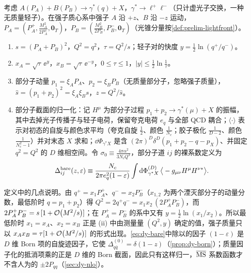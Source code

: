 \begin{definition}[DY 运动学]\label{def:dy-kin}
考虑 $A(P_A)+B(P_B)\to\gamma^*(q)+X$，$\gamma^*\to\ell^+\ell^-$（只计虚光子交换，一种无质量轻子）。在强子质心系中强子 $A$ 沿 $+z$、$B$ 沿 $-z$ 运动，
$P_A=(P_A^+,\frac{M_A^2}{2P_A^+},\mathbf 0_T)$，$P_B=(\frac{M_B^2}{2P_B^-},P_B^-,\mathbf 0_T)$（光锥分量按\cref{def:prelim-lightfront}）。
\begin{enumerate}[label=(\roman*),leftmargin=2.2em,itemsep=1pt,topsep=2pt]
\item $s=(P_A+P_B)^2$，$Q^2=q^2$，$\tau=Q^2/s$；轻子对的快度 $y=\frac12\ln(q^+/q^-)$。
\item $x_A=\sqrt\tau\,\ee^{y}$，$x_B=\sqrt\tau\,\ee^{-y}$，$0\le\tau\le1$，$|y|\le\frac12\ln\frac1\tau$。
\item 部分子动量 $p_1=\xi_AP_A$、$p_2=\xi_BP_B$（无质量部分子，忽略强子质量），$\hat s=(p_1+p_2)^2=\xi_A\xi_Bs$，$z=Q^2/\hat s$。
\item 部分子截面的归一化：记 $H^\mu$ 为部分子过程 $p_1+p_2\to\gamma^*(\mu)+X$ 的振幅，其中去掉光子传播子与轻子电荷，保留夸克电荷 $e_q$ 与全部 QCD 耦合；$\langle\cdot\rangle$ 表示对初态的自旋与颜色求平均（夸克自旋 $\frac12$、颜色 $\frac1{N_c}$；胶子极化 $\frac{1}{D-2}$、颜色 $\frac1{N_c^2-1}$）并对末态 $X$ 求和；$\dd\Phi_{\gamma^*X}$ 是含 $(2\pi)^D\delta^D(p_1+p_2-q-p_X)$、并固定 $q^2=Q^2$ 的 $D$ 维相空间。令 $\sigma_0\equiv\frac{4\pi\alpha^2}{3N_cQ^2}$，部分子道 $ij$ 的裸系数定义为
\begin{equation}\label{eq:dy-bare}
\Delta^{\rm bare}_{ij}(z,\varepsilon)\equiv\frac{N_c}{2\pi e_q^2(1-\varepsilon)}\int\mathrm{d}\Phi^{(D)}_{\gamma^*X}\,\big\langle-g_{\mu\nu}H^\mu H^{\nu*}\big\rangle .
\end{equation}
\end{enumerate}
\end{definition}

定义中的几点说明。由 $q^+=x_1P_A^+$、$q^-=x_2P_B^-$（$x_{1,2}$ 为两个湮灭部分子的动量分数，最低阶时 $q=p_1+p_2$）得 $Q^2=2q^+q^-=x_1x_2\,(2P_A^+P_B^-)$，而 $2P_A^+P_B^-=s\,[1+\mathcal{O}\!\left(M^2/s\right)]$；在 $P_A^+=P_B^-$ 的系中又有 $y=\frac12\ln(x_1/x_2)$。所以最低阶时 $x_1=x_A$、$x_2=x_B$ 正是 (ii) 中由测量量 $(Q^2,y)$ 确定的值，强子质量只以 $x_Ax_B=\tau[1+\mathcal{O}\!\left(M^2/s\right)]$ 的形式出现。\cref{eq:dy-bare}中除以的因子 $(1-\varepsilon)$ 是 $D$ 维 Born 项的自旋迹因子，它使 $\Delta^{(0)}_{q\bar q}=\delta(1-z)$（\cref{prop:dy-born}）；质量因子化的抵消项乘的正是 $D$ 维的 Born 截面，因此只有这样归一，$\overline{\mathrm{MS}}$ 系数函数才不含人为的 $\pm2P_{qq}$（\cref{sec:dy-nlo}）。

